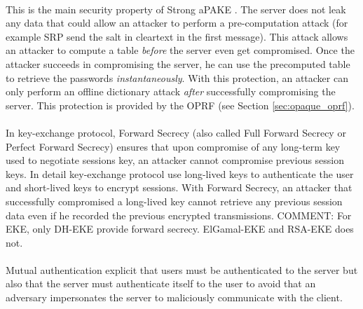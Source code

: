 ﻿\documentclass[../report.tex]{subfiles}
\begin{document}
\paragraph{} \label{sec:secure_against_pca}
This is the main security property of Strong aPAKE \cite{OPAQUE_Paper}. The server does not leak any data that could allow an attacker to perform a pre-computation attack (for example SRP send the salt in cleartext in the first message). This attack allows an attacker to compute a table \emph{before} the server even get compromised. Once the attacker succeeds in compromising the server, he can use the precomputed table to retrieve the passwords \emph{instantaneously}. With this protection, an attacker can only perform an offline dictionary attack \emph{after} successfully compromising the server.
This protection is provided by the OPRF (see Section \ref{sec:opaque_oprf}).

\paragraph{}
In key-exchange protocol, Forward Secrecy (also called Full Forward Secrecy or Perfect Forward Secrecy) ensures that upon compromise of any long-term key used to negotiate sessions key, an attacker cannot compromise previous session keys.
In detail key-exchange protocol use long-lived keys to authenticate the user and short-lived keys to encrypt sessions. With Forward Secrecy, an attacker that successfully compromised a long-lived key cannot retrieve any previous session data even if he recorded the previous encrypted transmissions. %
COMMENT: For EKE, only DH-EKE provide forward secrecy. ElGamal-EKE and RSA-EKE does not.
\paragraph{}
Mutual authentication explicit that users must be authenticated to the server but also that the server must authenticate itself to the user to avoid that an adversary impersonates the server to maliciously communicate with the client.
\end{document}
